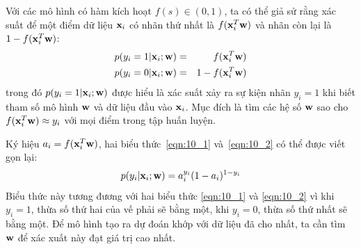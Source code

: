 Với các mô hình có hàm kích hoạt $f(s) \in (0, 1)$, ta có thể
giả sử rằng xác suất để một điểm dữ liệu $\mathbf{x}_i$ có nhãn thứ nhất là
$f(\mathbf{x}_i^T\mathbf{w})$ và nhãn còn lại là $1 -
f(\mathbf{x}_i^T\mathbf{w})$:
\begin{eqnarray}
\label{eqn:10_1}
p(y_i = 1 | \mathbf{x}_i; \mathbf{w}) &=& f(\mathbf{x}_i^T\mathbf{w})  \\
\label{eqn:10_2}
p(y_i = 0 | \mathbf{x}_i; \mathbf{w}) &=& 1 - f(\mathbf{x}_i^T\mathbf{w})
\end{eqnarray}
trong đó $p(y_i = 1 | \mathbf{x}_i; \mathbf{w})$ được hiểu là xác suất xảy ra sự
kiện nhãn $y_i = 1$ khi biết tham số mô hình $\mathbf{w}$ và dữ liệu đầu vào
$\mathbf{x}_i$.
Mục đích là tìm các hệ số $\mathbf{w}$ sao cho $f(\mathbf{x}_i^T\mathbf{w}) \approx y_i$ với mọi điểm trong tập huấn luyện.

Ký hiệu $a_i = f(\mathbf{x}_i^T\mathbf{w})$, hai biểu thức~\eqref{eqn:10_1} và~\eqref{eqn:10_2} có thể được viết gọn lại:
\begin{equation}
p(y_i| \mathbf{x}_i; \mathbf{w}) = a_i^{y_i}(1 - a_i)^{1- y_i}
\end{equation}
Biểu thức này tương đương với hai biểu thức \eqref{eqn:10_1} và
\eqref{eqn:10_2} vì khi $y_i=1$, thừa số thứ hai của vế phải sẽ bằng một,
khi $y_i = 0$, thừa số thứ nhất sẽ bằng một. Để mô hình tạo ra dự đoán khớp với dữ
liệu đã cho nhất, ta cần tìm $\mathbf{w}$ để xác xuất này đạt giá trị cao nhất.

